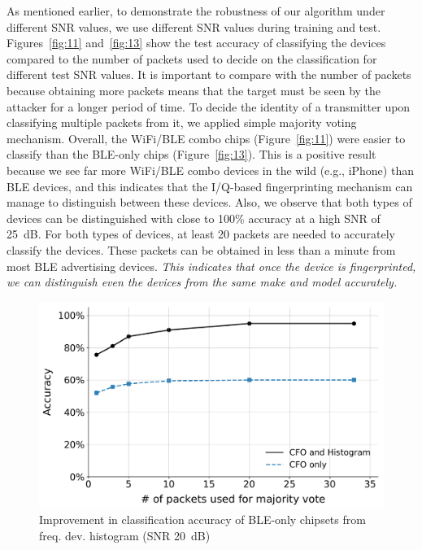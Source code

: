 As mentioned earlier, to demonstrate the robustness of our algorithm under different SNR values, we use different SNR values during training and test. Figures~\ref{fig:11} and~\ref{fig:13} show the test accuracy of classifying the
devices compared to the number of packets used to decide on the classification for different test SNR values.
It is important to compare with the number of packets because obtaining more
packets means that the target must be seen by the attacker for a longer period
of time. To decide the identity of a transmitter upon classifying multiple
packets from it, we applied simple majority voting mechanism. Overall, the
WiFi/BLE combo chips (Figure~\ref{fig:11}) were easier to classify than the
BLE-only chips (Figure~\ref{fig:13}). This is a positive result because we see
far more WiFi/BLE combo devices in the wild (e.g., iPhone) than BLE devices,
and this indicates that the \mbox{I/Q}-based fingerprinting mechanism can
manage to distinguish between these devices. Also, we observe that both types
of devices can be distinguished with close to 100\% accuracy at a high SNR of
25~dB. For both types of devices, at least 20 packets are needed to accurately
classify the devices. These packets can be obtained in less than a minute from
most BLE advertising devices. \textit{This indicates that once the device is fingerprinted, we can distinguish even the devices from the same make and model accurately.}

\begin{figure}
\centering
\includegraphics[width=\linewidth]{plots/accuracy_cfo2.pdf}
\caption{Improvement in classification accuracy of BLE-only chipsets from freq. dev. histogram (SNR 20~dB)}
\label{fig:12}
\end{figure}


